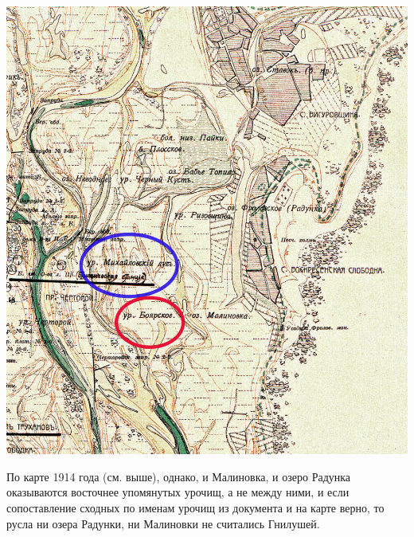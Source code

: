 \begin{center}
\includegraphics[width=\linewidth]{chast-gorodki/star-ist/gnil-xxx.jpg}
\end{center}

По карте 1914 года (см. выше), однако, и Малиновка, и озеро Радунка оказываются восточнее упомянутых урочищ, а не между ними, и если сопоставление сходных по именам урочищ из документа и на карте верно, то русла ни озера Радунки, ни Малиновки не считались Гнилушей.




